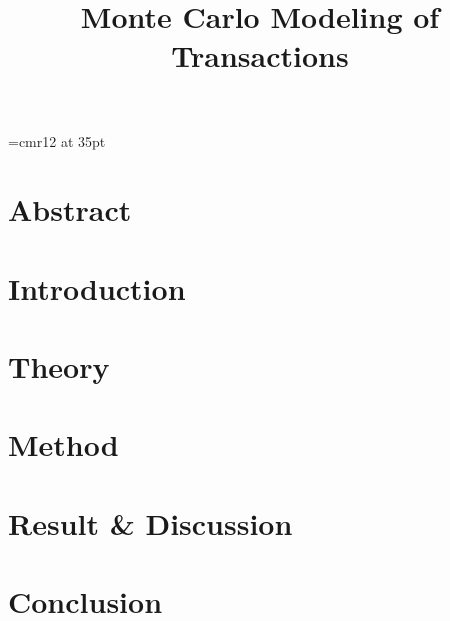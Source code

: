 
\font\myfont=cmr12 at 35pt
\title{\textbf{{\myfont Monte Carlo Modeling of Transactions}}}

\mnfrontpage


\pagestyle{fancy}
\fancyhf{}
\fancyfoot[CE,LO]{\leftmark}

\renewcommand{\headrulewidth}{2pt}
\renewcommand{\footrulewidth}{1pt}

\tableofcontents



\pagebreak
\pagebreak
\section*{Abstract}%

\cite{compphys}


\section{Introduction}



\section{Theory}\label{sec:theory}




\section{Method}




\section{Result \& Discussion}




%


\section{Conclusion}



\printbibliography

